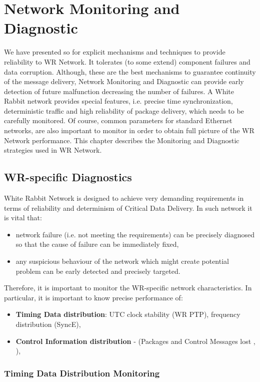 \chapter{Network Monitoring and Diagnostic}
\label{chapter:monitoring}
We have presented so for explicit mechanisms and techniques to provide
reliability to WR Network. It tolerates (to some extend) component failures and
data corruption. Although, these are the best mechanisms to guarantee continuity
of the message delivery, Network Monitoring and Diagnostic can provide early
detection of future malfunction decreasing the number of failures.
A White Rabbit network provides special features, i.e. precise time
synchronization, deterministic traffic and high reliability of package
delivery, which needs to be carefully monitored. Of course, common parameters 
for standard Ethernet networks, are also important to monitor in order to
obtain full picture of the WR Network performance. This chapter describes the
Monitoring and Diagnostic strategies used in WR Network.


\section{WR-specific Diagnostics}

White Rabbit Network is designed to achieve very demanding requirements in terms
of reliability and determinism of Critical Data Delivery. In such network it is
vital that:
\begin{itemize}
	\item network failure (i.e. not meeting the requirements) can be
precisely diagnosed so that the cause of failure can be immediately fixed,
	\item any suspicious behaviour of the network which might create
potential problem can be early detected and precisely targeted.
\end{itemize}
Therefore, it is important to monitor the WR-specific network characteristics. 
In particular, it is important to know
precise performance of:
\begin{itemize}
	\item \textbf{Timing Data distribution}: UTC clock stability (WR
	      PTP), frequency distribution (SyncE),
	\item \textbf{Control Information distribution} - (\HP Packages and
	      Control Messages lost , \HighPriority),
\end{itemize}


\subsection{Timing Data Distribution Monitoring}

